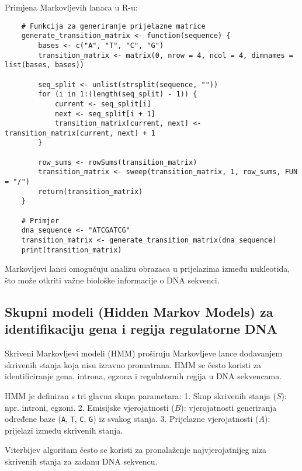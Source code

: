 \documentclass[10pt,a4paper,twoside]{article}
\begin{document}
Primjena Markovljevih lanaca u R-u:
\begin{verbatim}
	# Funkcija za generiranje prijelazne matrice
	generate_transition_matrix <- function(sequence) {
		bases <- c("A", "T", "C", "G")
		transition_matrix <- matrix(0, nrow = 4, ncol = 4, dimnames = list(bases, bases))
		
		seq_split <- unlist(strsplit(sequence, ""))
		for (i in 1:(length(seq_split) - 1)) {
			current <- seq_split[i]
			next <- seq_split[i + 1]
			transition_matrix[current, next] <- transition_matrix[current, next] + 1
		}
		
		row_sums <- rowSums(transition_matrix)
		transition_matrix <- sweep(transition_matrix, 1, row_sums, FUN = "/")
		return(transition_matrix)
	}
	
	# Primjer
	dna_sequence <- "ATCGATCG"
	transition_matrix <- generate_transition_matrix(dna_sequence)
	print(transition_matrix)
\end{verbatim}

Markovljevi lanci omogućuju analizu obrazaca u prijelazima između nukleotida, što može otkriti važne biološke informacije o DNA sekvenci.

\subsection*{Skupni modeli (Hidden Markov Models) za identifikaciju gena i regija regulatorne DNA}

Skriveni Markovljevi modeli (HMM) proširuju Markovljeve lance dodavanjem skrivenih stanja koja nisu izravno promatrana. HMM se često koristi za identificiranje gena, introna, egzona i regulatornih regija u DNA sekvencama.

HMM je definiran s tri glavna skupa parametara:
1. Skup skrivenih stanja (\( S \)): npr. introni, egzoni.
2. Emisijske vjerojatnosti (\( B \)): vjerojatnosti generiranja određene baze (\texttt{A}, \texttt{T}, \texttt{C}, \texttt{G}) iz svakog stanja.
3. Prijelazne vjerojatnosti (\( A \)): prijelazi između skrivenih stanja.

Viterbijev algoritam često se koristi za pronalaženje najvjerojatnijeg niza skrivenih stanja za zadanu DNA sekvencu.
\end{document}
